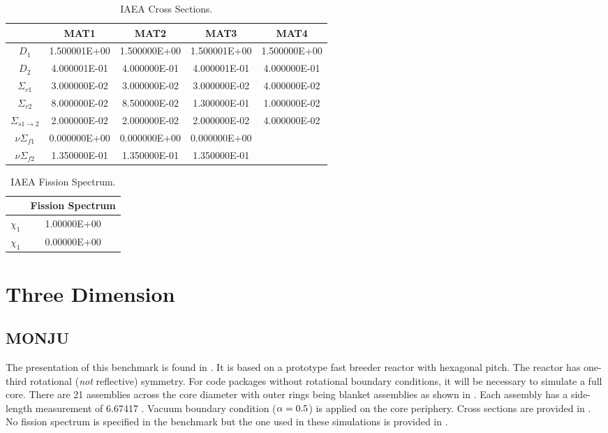     \begin{table}
      \caption{IAEA Cross Sections.}
      \label{tab:iaeaxs}
      \begin{center}
        \begin{tabular}{ccccc}
          \toprule
          &MAT1&MAT2&MAT3&MAT4\\
          \midrule
          $D_1$&1.500001E+00&1.500000E+00&1.500001E+00&1.500000E+00\\
          $D_2$&4.000001E-01&4.000000E-01&4.000001E-01&4.000000E-01\\
          $\Sigma_{r1}$&3.000000E-02&3.000000E-02&3.000000E-02&4.000000E-02\\
          $\Sigma_{r2}$&8.000000E-02&8.500000E-02&1.300000E-01&1.000000E-02\\
          $\Sigma_{s 1\rightarrow 2}$&2.000000E-02&2.000000E-02&2.000000E-02&4.000000E-02\\
          $ \nu \Sigma_{f1}$&0.000000E+00&0.000000E+00&0.000000E+00&\\
          $ \nu \Sigma_{f2}$&1.350000E-01&1.350000E-01&1.350000E-01&\\
          \bottomrule
        \end{tabular}
      \end{center}
    \end{table}
    \begin{table}
      \caption{IAEA Fission Spectrum.}
      \label{tab:iaeachi}
      \begin{center}
        \begin{tabular}{cc}
          \toprule
          &Fission Spectrum \\
          \midrule
          $\chi_1$&1.00000E+00  \\
          $\chi_1$&0.00000E+00  \\
          \bottomrule
        \end{tabular}
      \end{center}
    \end{table}
\section{Three Dimension}
  \subsection{MONJU}
    \label{sec:monju}
    The presentation of this benchmark is found in \cite{monjuBenchmark}. It is
    based on a prototype fast breeder reactor with hexagonal pitch. The reactor
    has one-third rotational (\textit{not} reflective) symmetry. For code
    packages without rotational boundary conditions, it will be necessary to
    simulate a full core. There are 21 assemblies across the core diameter with
    outer rings being blanket assemblies as shown in .
    Each assembly has a side-length measurement of 6.67417 . Vacuum
    boundary condition ($\alpha = 0.5$) is applied on the core periphery. Cross
    sections are provided in . No fission spectrum is
    specified in the benchmark but the one used in these simulations is provided
    in .

